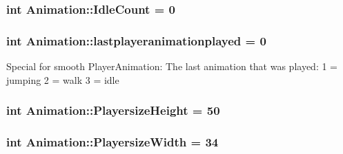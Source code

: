 \subsubsection[{\texorpdfstring{Idle\+Count}{IdleCount}}]{\setlength{\rightskip}{0pt plus 5cm}int Animation\+::\+Idle\+Count = 0\hspace{0.3cm}{\ttfamily [protected]}}\hypertarget{classAnimation_ac717012475788ebb501d44c5acc8f09e}{}\label{classAnimation_ac717012475788ebb501d44c5acc8f09e}
\subsubsection[{\texorpdfstring{lastplayeranimationplayed}{lastplayeranimationplayed}}]{\setlength{\rightskip}{0pt plus 5cm}int Animation\+::lastplayeranimationplayed = 0\hspace{0.3cm}{\ttfamily [protected]}}\hypertarget{classAnimation_a5d14d0bf77c2f5eb34f84a51c32ab465}{}\label{classAnimation_a5d14d0bf77c2f5eb34f84a51c32ab465}
Special for smooth Player\+Animation\+: The last animation that was played\+: 1 = jumping 2 = walk 3 = idle 
\subsubsection[{\texorpdfstring{Playersize\+Height}{PlayersizeHeight}}]{\setlength{\rightskip}{0pt plus 5cm}int Animation\+::\+Playersize\+Height = 50\hspace{0.3cm}{\ttfamily [protected]}}\hypertarget{classAnimation_a8aff77b932ad98856335149cbd9b0eb9}{}\label{classAnimation_a8aff77b932ad98856335149cbd9b0eb9}
\subsubsection[{\texorpdfstring{Playersize\+Width}{PlayersizeWidth}}]{\setlength{\rightskip}{0pt plus 5cm}int Animation\+::\+Playersize\+Width = 34\hspace{0.3cm}{\ttfamily [protected]}}\hypertarget{classAnimation_a5fa2dfbbf58158d08b03b3f6fe677d6c}{}\label{classAnimation_a5fa2dfbbf58158d08b03b3f6fe677d6c}
